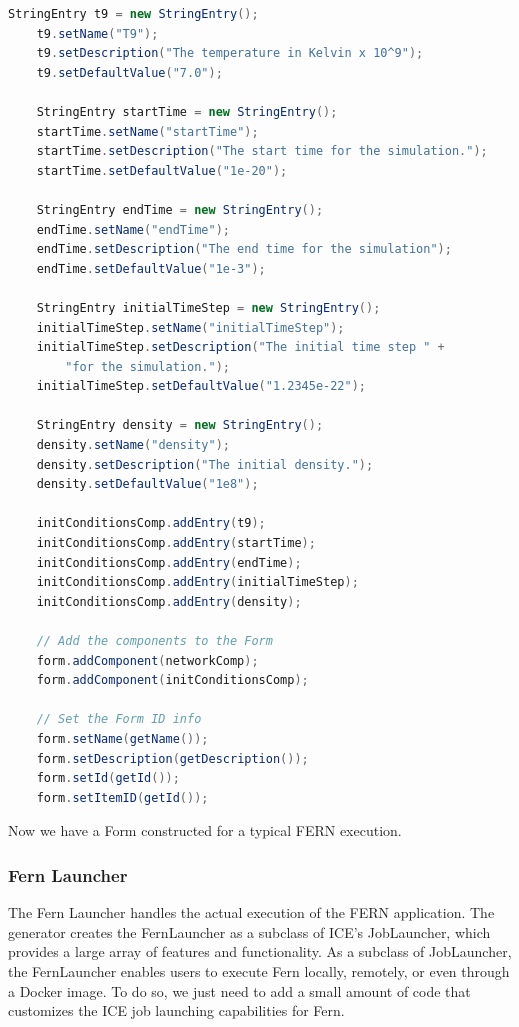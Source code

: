 \begin{lstlisting}[language=Java]
    StringEntry t9 = new StringEntry();
    t9.setName("T9");
    t9.setDescription("The temperature in Kelvin x 10^9");
    t9.setDefaultValue("7.0");

    StringEntry startTime = new StringEntry();
    startTime.setName("startTime");
    startTime.setDescription("The start time for the simulation.");
    startTime.setDefaultValue("1e-20");

    StringEntry endTime = new StringEntry();
    endTime.setName("endTime");
    endTime.setDescription("The end time for the simulation");
    endTime.setDefaultValue("1e-3");

    StringEntry initialTimeStep = new StringEntry();
    initialTimeStep.setName("initialTimeStep");
    initialTimeStep.setDescription("The initial time step " + 
    	"for the simulation."); 
    initialTimeStep.setDefaultValue("1.2345e-22");

    StringEntry density = new StringEntry();
    density.setName("density");
    density.setDescription("The initial density.");
    density.setDefaultValue("1e8");
    
    initConditionsComp.addEntry(t9);
    initConditionsComp.addEntry(startTime);
    initConditionsComp.addEntry(endTime);
    initConditionsComp.addEntry(initialTimeStep);
    initConditionsComp.addEntry(density);
    
    // Add the components to the Form
    form.addComponent(networkComp);    
    form.addComponent(initConditionsComp);
    
    // Set the Form ID info
    form.setName(getName());
    form.setDescription(getDescription());
    form.setId(getId());
    form.setItemID(getId());
\end{lstlisting}

Now we have a Form constructed for a typical FERN execution.

\subsubsection*{Fern Launcher}
The Fern Launcher handles the actual execution of the FERN application. The
generator creates the FernLauncher as a subclass of ICE's JobLauncher, which
provides a large array of features and functionality. As a subclass of
JobLauncher, the FernLauncher enables users to execute Fern locally, remotely,
or even through a Docker image. To do so, we just need to add a small amount of
code that customizes the ICE job launching capabilities for Fern. 

